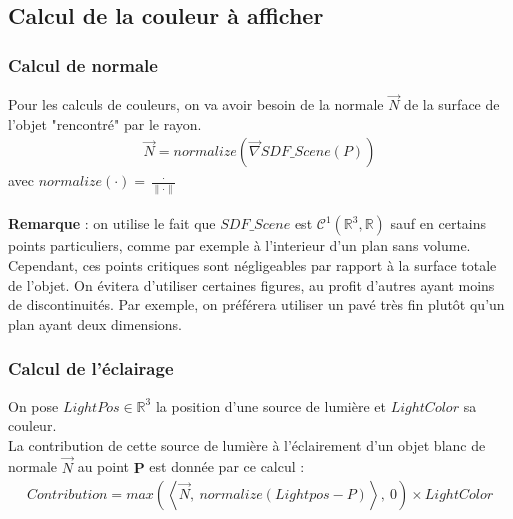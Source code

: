 \newpage
\subsection{Calcul de la couleur à afficher}
\subsubsection{Calcul de normale}
Pour les calculs de couleurs, on va avoir besoin de la normale $\Vec{N}$ de la surface de l'objet "rencontré" par le rayon.
\begin{align*}
    \Vec{N}=normalize(\Vec{\nabla}SDF\_Scene(P))
\end{align*}
avec $normalize(\cdot )=\frac{\cdot }{\|\cdot \|}$\\
\\
\textbf{Remarque} : on utilise le fait que $SDF\_Scene$ est $\mathcal{C}^1(\mathbb{R}^3,\mathbb{R})$ sauf en certains points particuliers, comme par exemple à l'interieur d'un plan sans volume. Cependant, ces points critiques sont négligeables par rapport à la surface totale de l'objet. On évitera d'utiliser certaines figures, au profit d'autres ayant moins de discontinuités. Par exemple, on préférera utiliser un pavé très fin plutôt qu'un plan ayant deux dimensions.
\subsubsection{Calcul de l'éclairage}
On pose $LightPos \in \mathbb{R}^3$ la position d'une source de lumière et $LightColor$ sa couleur.
\\La contribution de cette source de lumière à l'éclairement d'un objet blanc de normale $\Vec{N}$ au point $\mathbf{P}$ est donnée par ce calcul : 
\begin{align*}
    Contribution=max(\left\langle \Vec{N},\ normalize(Lightpos-P) \right\rangle,\ 0) \times LightColor
\end{align*}